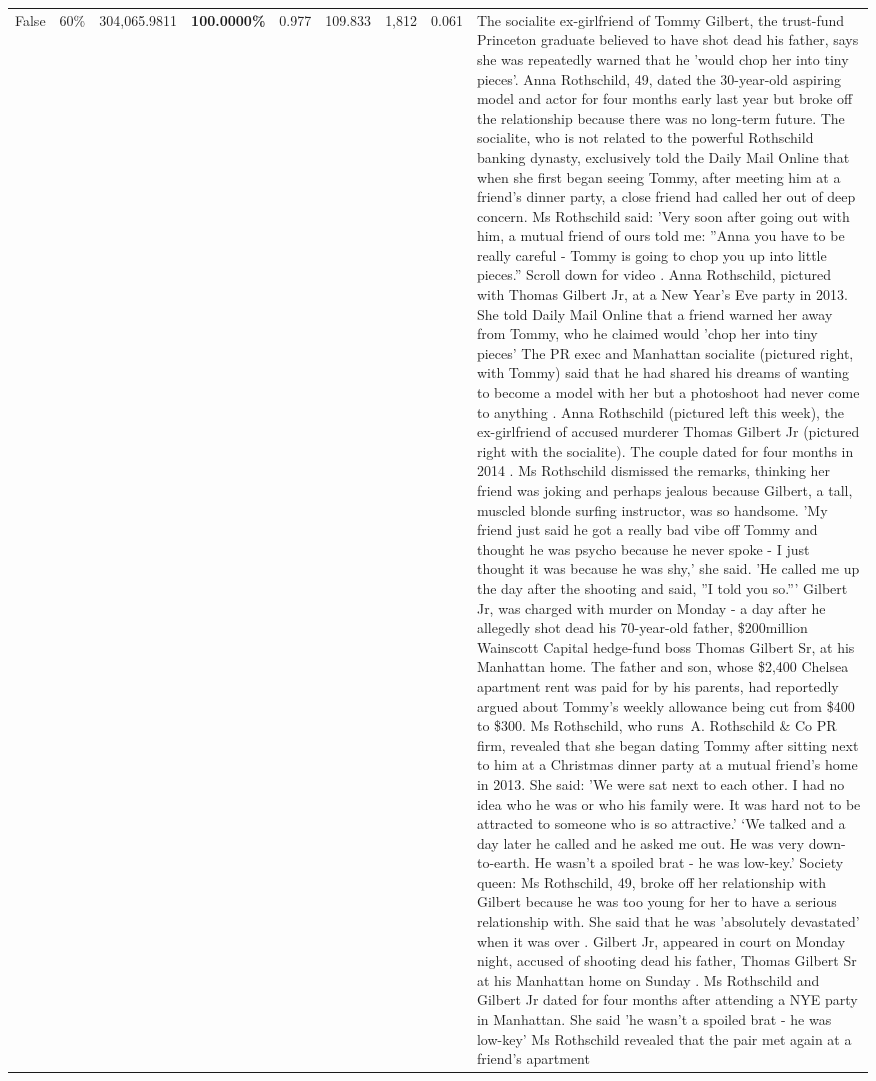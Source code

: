 \begin{table}[H]
\begin{tabular}{lllrlllll}
False & 60\% & \color{red} 304,065.9811 & \bfseries \color{red} 100.0000\% & 0.977 & 109.833 & 1,812 & 0.061 & The socialite ex-girlfriend of Tommy Gilbert, the trust-fund Princeton graduate believed to have shot dead his father, says she was repeatedly warned that he 'would chop her into tiny pieces'. Anna Rothschild, 49, dated the 30-year-old aspiring model and actor for four months early last year but broke off the relationship because there was no long-term future. The socialite, who is not related to the powerful Rothschild banking dynasty, exclusively told the Daily Mail Online that when she first began seeing Tommy, after meeting him at a friend's dinner party, a close friend had called her out of deep concern. Ms Rothschild said: 'Very soon after going out with him, a mutual friend of ours told me: ''Anna you have to be really careful - Tommy is going to chop you up into little pieces.'' Scroll down for video . Anna Rothschild, pictured with Thomas Gilbert Jr, at a New Year's Eve party in 2013. She told Daily Mail Online that a friend warned her away from Tommy, who he claimed would 'chop her into tiny pieces' The PR exec and Manhattan socialite (pictured right, with Tommy) said that he had shared his dreams of wanting to become a model with her but a photoshoot had never come to anything . Anna Rothschild (pictured left this week), the ex-girlfriend of accused murderer Thomas Gilbert Jr (pictured right with the socialite). The couple dated for four months in 2014 . Ms Rothschild dismissed the remarks, thinking her friend was joking and perhaps jealous because Gilbert, a tall, muscled blonde surfing instructor, was so handsome. 'My friend just said he got a really bad vibe off Tommy and thought he was psycho because he never spoke - I just thought it was because he was shy,' she said. 'He called me up the day after the shooting and said, ''I told you so.''' Gilbert Jr, was charged with murder on Monday - a day after he allegedly shot dead his 70-year-old father, \$200million Wainscott Capital hedge-fund boss Thomas Gilbert Sr, at his Manhattan home. The father and son, whose \$2,400 Chelsea apartment rent was paid for by his parents, had reportedly argued about Tommy's weekly allowance being cut from \$400 to \$300. Ms Rothschild, who runs A. Rothschild \& Co PR firm, revealed that she began dating Tommy after sitting next to him at a Christmas dinner party at a mutual friend's home in 2013. She said: 'We were sat next to each other. I had no idea who he was or who his family were. It was hard not to be attracted to someone who is so attractive.' ‘We talked and a day later he called and he asked me out. He was very down-to-earth. He wasn’t a spoiled brat - he was low-key.’ Society queen: Ms Rothschild, 49, broke off her relationship with Gilbert because he was too young for her to have a serious relationship with. She said that he was 'absolutely devastated' when it was over . Gilbert Jr, appeared in court on Monday night, accused of shooting dead his father, Thomas Gilbert Sr at his Manhattan home on Sunday . Ms Rothschild and Gilbert Jr dated for four months after attending a NYE party in Manhattan. She said 'he wasn't a spoiled brat - he was low-key' Ms Rothschild revealed that the pair met again at a friend’s apartment 
\end{tabular}
\end{table}
